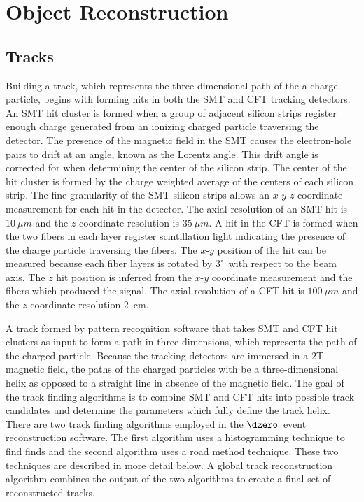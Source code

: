 \section{Object Reconstruction}
\subsection{Tracks}

Building a track, which represents the three dimensional path of the a charge particle, begins with forming hits in both the SMT and CFT tracking detectors. An SMT hit cluster is formed when a group of adjacent silicon strips register enough charge generated from an ionizing charged particle traversing the detector. The presence of the magnetic field in the SMT causes the electron-hole pairs to drift at an angle, known as the Lorentz angle. This drift angle is corrected for when determining the center of the silicon strip. The center of the hit cluster is formed by the charge weighted average of the centers of each silicon strip. The fine granularity of the SMT silicon strips allows an $x$-$y$-$z$ coordinate measurement for each hit in the detector. The axial resolution of an SMT hit is $10~\mu m$ and the $z$ coordinate resolution is $35~\mu m$. A hit in the CFT is formed when the two fibers in each layer register scintillation light indicating the presence of the charge particle traversing the fibers. The $x$-$y$ position of the hit can be measured because each fiber layers is rotated by $3^{\circ}$~with respect to the beam axis. The $z$ hit position is inferred from the $x$-$y$ coordinate measurement and the fibers which produced the signal. 
The axial resolution of a CFT hit is $100~\mu m$ and the $z$ coordinate resolution $2$~cm.

A track formed by pattern recognition software that takes SMT and CFT hit clusters as input to form a path in three dimensions, which represents the path of the charged particle. Because the tracking detectors are immersed in a $2$T magnetic field, the paths of the charged particles with be a three-dimensional helix as opposed to a straight line in absence of the magnetic field. The goal of the track finding algorithms is to combine SMT and CFT hits into possible track candidates and determine the parameters which fully define the track helix. There are two track finding algorithms employed in the $\dzero$~event reconstruction software. The first algorithm uses a histogramming technique to find finds and the second algorithm uses a road method technique. These two techniques are described in more detail below. A global track reconstruction algorithm combines the output of the two algorithms to create a final set of reconstructed tracks.


